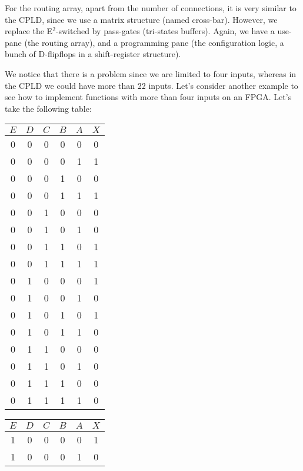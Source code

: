 \documentclass[a4paper]{article}
\begin{document}
{    For the routing array, apart from the number of connections, it is very similar to the CPLD, since we use a matrix structure (named cross-bar). However, we replace the E$^2$-switched by pass-gates (tri-states buffers). Again, we have a use-pane (the routing array), and a programming pane (the configuration logic, a bunch of D-flipflops in a shift-register structure). 

    We notice that there is a problem since we are limited to four inputs, whereas in the CPLD we could have more than 22 inputs. Let's consider another example to see how to implement functions with more than four inputs on an FPGA. Let's take the following table: 
    \begin{center}
        \begin{tabular}{ccccc|c}
            $E$ & $D$ & $C$ & $B$ & $A$ & $X$ \\
            \hline
            0 & 0 & 0 & 0 & 0 & 0 \\
            0 & 0 & 0 & 0 & 1 & 1 \\
            0 & 0 & 0 & 1 & 0 & 0 \\
            0 & 0 & 0 & 1 & 1 & 1 \\
            0 & 0 & 1 & 0 & 0 & 0 \\
            0 & 0 & 1 & 0 & 1 & 0 \\
            0 & 0 & 1 & 1 & 0 & 1 \\
            0 & 0 & 1 & 1 & 1 & 1 \\
            0 & 1 & 0 & 0 & 0 & 1 \\
            0 & 1 & 0 & 0 & 1 & 0 \\
            0 & 1 & 0 & 1 & 0 & 1 \\
            0 & 1 & 0 & 1 & 1 & 0 \\
            0 & 1 & 1 & 0 & 0 & 0 \\
            0 & 1 & 1 & 0 & 1 & 0 \\
            0 & 1 & 1 & 1 & 0 & 0 \\
            0 & 1 & 1 & 1 & 1 & 0 \\
        \end{tabular}
        \hspace{1em}
        \begin{tabular}{ccccc|c}
            $E$ & $D$ & $C$ & $B$ & $A$ & $X$ \\
            \hline
            1 & 0 & 0 & 0 & 0 & 1 \\
            1 & 0 & 0 & 0 & 1 & 0 \\

\end{tabular}
\end{center}}
\end{document}
